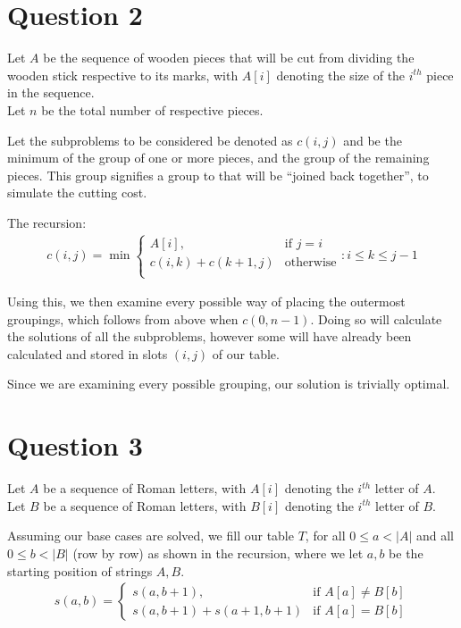 \documentclass{article}
\begin{document}
\pagebreak
\section*{Question 2}
Let $A$ be the sequence of wooden pieces that will be cut from dividing the wooden stick respective to its marks, with $A[i]$ denoting the size of the $i^{th}$ piece in the sequence.\\
Let $n$ be the total number of respective pieces.

Let the subproblems to be considered be denoted as $c(i, j)$ and be the minimum of the group of one or more pieces, and the group of the remaining pieces. This group signifies a group to that will be ``joined back together'', to simulate the cutting cost.

The recursion:
\begin{align*}
c(i, j) = \min
\begin{cases}
    A[i],        & \text{if } j = i\\
    c(i, k) + c(k+1, j) & \text{otherwise}\\
\end{cases}
    : i \leq k \leq j - 1
\end{align*}

Using this, we then examine every possible way of placing the outermost groupings, which follows from above when $c(0, n-1)$. Doing so will calculate the solutions of all the subproblems, however some will have already been calculated and stored in slots $(i, j)$ of our table.

Since we are examining every possible grouping, our solution is trivially optimal.

\section*{Question 3}
Let $A$ be a sequence of Roman letters, with $A[i]$ denoting the $i^{th}$ letter of $A$.\\
Let $B$ be a sequence of Roman letters, with $B[i]$ denoting the $i^{th}$ letter of $B$.

Assuming our base cases are solved, we fill our table $T$, for all $0 \leq a < |A|$ and all $0 \leq b < |B|$ (row by row) as shown in the recursion, where we let $a, b$ be the starting position of strings $A, B$.
\begin{align*}
s(a, b) =
\begin{cases}
    s(a, b+1),              & \text{if } A[a] \neq B[b]\\
    s(a, b+1) + s(a+1, b+1) & \text{if } A[a] = B[b]
\end{cases}
\end{align*}
\end{document}
